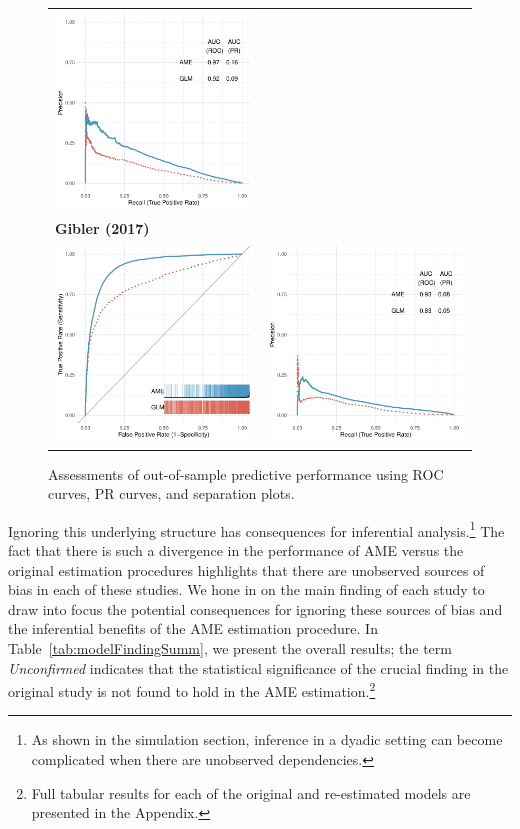 \begin{figure}
\begin{tabular}{cc}
		\includegraphics[width=.4\textwidth]{graphics/figure6_weeks_pr_outSample.pdf} \\
		\multicolumn{2}{l}{\textbf{\tiny{Gibler (2017)}}} \\
		\includegraphics[width=.4\textwidth]{graphics/figure6_gibler_roc_outSample.pdf} &
		\includegraphics[width=.4\textwidth]{graphics/figure6_gibler_pr_outSample.pdf} \\
	\end{tabular}
	\caption{Assessments of out-of-sample predictive performance using ROC curves, PR curves, and separation plots.}
	\label{fig:perf}
\end{figure}

Ignoring this underlying structure has consequences for inferential analysis.\footnote{As shown in the simulation section, inference in a dyadic setting can become complicated when there are unobserved dependencies.} The fact that there is such a divergence in the performance of AME versus the original estimation procedures highlights that there are unobserved sources of bias in each of these studies. We hone in on the main finding of each study to draw into focus the potential consequences for ignoring these sources of bias and the inferential benefits of the AME estimation procedure.  In Table~\ref{tab:modelFindingSumm}, we present the overall results; the term \textit{Unconfirmed} indicates that the statistical significance of the crucial finding in the original study is not found to hold in the AME estimation.\footnote{Full tabular results for each of the original and re-estimated models are presented in the Appendix.}

